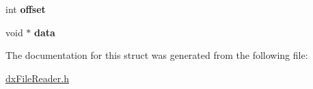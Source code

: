 \begin{DoxyCompactItemize}
\item 
\hypertarget{structarray__struct_a838b916b1927ddbf81f5fecc7675e499}{
int {\bfseries offset}}
\label{structarray__struct_a838b916b1927ddbf81f5fecc7675e499}

\item 
\hypertarget{structarray__struct_ab0b35032769740a9cce2f9ccedfb236b}{
void $\ast$ {\bfseries data}}
\label{structarray__struct_ab0b35032769740a9cce2f9ccedfb236b}

\end{DoxyCompactItemize}


The documentation for this struct was generated from the following file:\begin{DoxyCompactItemize}
\item 
\hyperlink{dxFileReader_8h}{dxFileReader.h}\end{DoxyCompactItemize}
